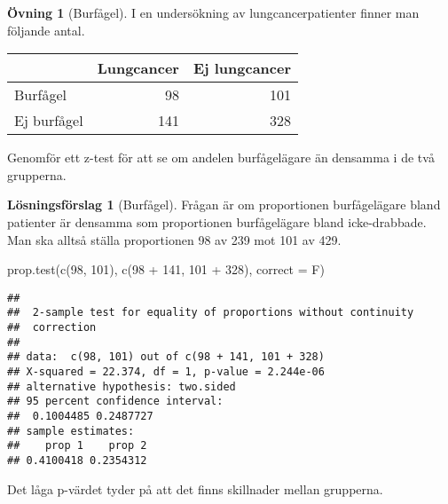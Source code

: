 \documentclass[
]{book}
\newenvironment{Shaded}{\begin{snugshade}}{\end{snugshade}}
\newcommand{\AttributeTok}[1]{\textcolor[rgb]{0.77,0.63,0.00}{#1}}
\newcommand{\DecValTok}[1]{\textcolor[rgb]{0.00,0.00,0.81}{#1}}
\newcommand{\FunctionTok}[1]{\textcolor[rgb]{0.00,0.00,0.00}{#1}}
\newcommand{\NormalTok}[1]{#1}
\newcommand{\SpecialCharTok}[1]{\textcolor[rgb]{0.00,0.00,0.00}{#1}}
\theoremstyle{definition}
\theoremstyle{definition}
\theoremstyle{definition}
\newtheorem{exercise}{Övning}[chapter]
\theoremstyle{definition}
\newtheorem{hypothesis}{Lösningsförslag}[chapter]
\theoremstyle{remark}
\begin{document}
\begin{exercise}[Burfågel]
I en undersökning av lungcancerpatienter finner man följande antal.

\begin{table}
\centering
\begin{tabular}[t]{lrr}
\toprule
  & Lungcancer & Ej lungcancer\\
\midrule
Burfågel & 98 & 101\\
Ej burfågel & 141 & 328\\
\bottomrule
\end{tabular}
\end{table}

Genomför ett z-test för att se om andelen burfågelägare än densamma i de två grupperna.
\end{exercise}

\begin{hypothesis}[Burfågel]
Frågan är om proportionen burfågelägare bland patienter är densamma som proportionen burfågelägare bland icke-drabbade. Man ska alltså ställa proportionen 98 av 239 mot 101 av 429.

\begin{Shaded}
\begin{Highlighting}[]
\FunctionTok{prop.test}\NormalTok{(}\FunctionTok{c}\NormalTok{(}\DecValTok{98}\NormalTok{, }\DecValTok{101}\NormalTok{), }\FunctionTok{c}\NormalTok{(}\DecValTok{98} \SpecialCharTok{+} \DecValTok{141}\NormalTok{, }\DecValTok{101} \SpecialCharTok{+} \DecValTok{328}\NormalTok{), }\AttributeTok{correct =}\NormalTok{ F)}
\end{Highlighting}
\end{Shaded}

\begin{verbatim}
## 
##  2-sample test for equality of proportions without continuity
##  correction
## 
## data:  c(98, 101) out of c(98 + 141, 101 + 328)
## X-squared = 22.374, df = 1, p-value = 2.244e-06
## alternative hypothesis: two.sided
## 95 percent confidence interval:
##  0.1004485 0.2487727
## sample estimates:
##    prop 1    prop 2 
## 0.4100418 0.2354312
\end{verbatim}

Det låga p-värdet tyder på att det finns skillnader mellan grupperna.
\end{hypothesis}
\end{document}
